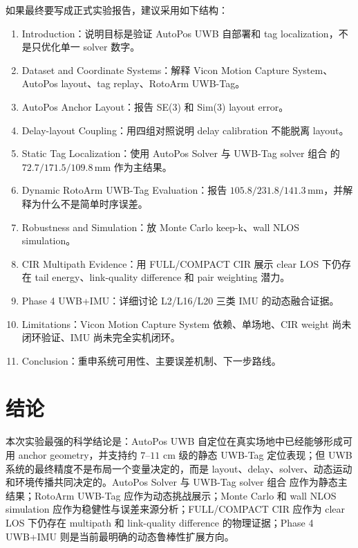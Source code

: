 \documentclass[11pt,a4paper]{ctexart}
\newcommand{\mm}{\,\mathrm{mm}}
\newcommand{\case}[1]{\texttt{\detokenize{#1}}}
\begin{document}
如果最终要写成正式实验报告，建议采用如下结构：
\begin{enumerate}
\item Introduction：说明目标是验证 AutoPos UWB 自部署和 tag localization，不是只优化单一 solver 数字。
\item Dataset and Coordinate Systems：解释 Vicon Motion Capture System、AutoPos layout、tag replay、RotoArm UWB-Tag。
\item AutoPos Anchor Layout：报告 SE(3) 和 Sim(3) layout error。
\item Delay-layout Coupling：用四组对照说明 delay calibration 不能脱离 layout。
\item Static Tag Localization：使用 AutoPos Solver 与 UWB-Tag solver 组合 \case{v4-io/T4} 的 $72.7/171.5/109.8\mm$ 作为主结果。
\item Dynamic RotoArm UWB-Tag Evaluation：报告 $105.8/231.8/141.3\mm$，并解释为什么不是简单时序误差。
\item Robustness and Simulation：放 Monte Carlo keep-k、wall NLOS simulation。
\item CIR Multipath Evidence：用 FULL/COMPACT CIR 展示 clear LOS 下仍存在 tail energy、link-quality difference 和 pair weighting 潜力。
\item Phase 4 UWB+IMU：详细讨论 L2/L16/L20 三类 IMU 的动态融合证据。
\item Limitations：Vicon Motion Capture System 依赖、单场地、CIR weight 尚未闭环验证、IMU 尚未完全实机闭环。
\item Conclusion：重申系统可用性、主要误差机制、下一步路线。
\end{enumerate}

\section{结论}

本次实验最强的科学结论是：AutoPos UWB 自定位在真实场地中已经能够形成可用 anchor geometry，并支持约 $7$--$11$ cm 级的静态 UWB-Tag 定位表现；但 UWB 系统的最终精度不是布局一个变量决定的，而是 layout、delay、solver、动态运动和环境传播共同决定的。AutoPos Solver 与 UWB-Tag solver 组合 \case{v4-io/T4} 应作为静态主结果；RotoArm UWB-Tag 应作为动态挑战展示；Monte Carlo 和 wall NLOS simulation 应作为稳健性与误差来源分析；FULL/COMPACT CIR 应作为 clear LOS 下仍存在 multipath 和 link-quality difference 的物理证据；Phase 4 UWB+IMU 则是当前最明确的动态鲁棒性扩展方向。
\end{document}
